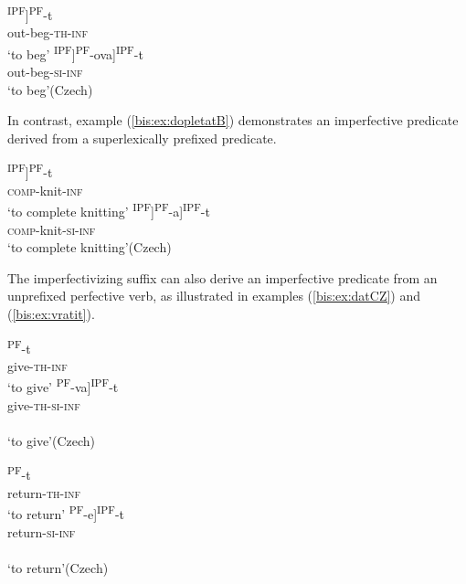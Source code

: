 \documentclass[output=paper]{langscibook}
\begin{document}
\ex\label{bis:ex:vyprosit}
\ea\label{bis:ex:vyprositA} \gll [vy-[pros-i]\textsuperscript{IPF}]\textsuperscript{PF}-t \\ 
out-beg-\textsc{th}-\textsc{inf} \\
\glt ‘to beg’
\ex\label{bis:ex:vyprosovatB} \gll [[vy-[proš]\textsuperscript{IPF}]\textsuperscript{PF}-ova]\textsuperscript{IPF}-t \\  
out-beg-\textsc{si}-\textsc{inf} \\
\glt ‘to beg’\hfill (Czech)
\z\z

\noindent In contrast, example (\ref{bis:ex:dopletatB}) demonstrates an imperfective predicate derived from a superlexically prefixed predicate. 

\ea\label{bis:ex:doplest}
\ea\label{bis:ex:doplestA} \gll [do-[plés]\textsuperscript{IPF}]\textsuperscript{PF}-t \\ 
\textsc{comp}-knit-\textsc{inf} \\
\glt ‘to complete knitting’
\ex\label{bis:ex:dopletatB} \gll [[do-[plét]\textsuperscript{IPF}]\textsuperscript{PF}-a]\textsuperscript{IPF}-t \\  
\textsc{comp}-knit-\textsc{si}-\textsc{inf} \\
\glt ‘to complete knitting’\hfill (Czech)
\z\z

\noindent The imperfectivizing suffix can also derive an imperfective predicate from an unprefixed perfective verb, as illustrated in examples (\ref{bis:ex:datCZ}) and (\ref{bis:ex:vratit}).

\ea\label{bis:ex:datCZ}
\ea\label{bis:ex:datCZA} \gll [d-á]\textsuperscript{PF}-t \\ 
give-\textsc{th}-\textsc{inf} \\
\glt ‘to give’
\ex\label{bis:ex:davatCZB} \gll [[d-á]\textsuperscript{PF}-va]\textsuperscript{IPF}-t \\  
give-\textsc{th}-\textsc{si}-\textsc{inf} \\ \\
\glt ‘to give’\hfill (Czech)
\z

\ex\label{bis:ex:vratit}
\ea\label{bis:ex:vratitA} \gll [vrát-i]\textsuperscript{PF}-t \\ 
return-\textsc{th}-\textsc{inf} \\
\glt ‘to return’
\ex\label{bis:ex:vracetB} \gll [[vrac]\textsuperscript{PF}-e]\textsuperscript{IPF}-t \\  
return-\textsc{si}-\textsc{inf} \\ \\
\glt ‘to return’\hfill (Czech)
\z\z
\end{document}
